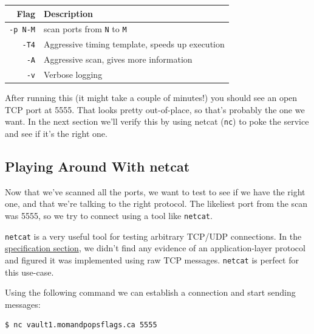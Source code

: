\documentclass[11pt]{article}
\begin{document}
    \begin{table}[h!]
        \centering
        \label{tab:nmap-command}
        \begin{tabular}{|r|l|}
            \hline
            \textbf{Flag} & \textbf{Description}                            \\ \hline
            \verb`-p N-M` & scan ports from \verb`N` to \verb`M`            \\ \hline
            \verb`-T4`    & Aggressive timing template, speeds up execution \\ \hline
            \verb`-A`     & Aggressive scan, gives more information         \\ \hline
            \verb`-v`     & Verbose logging                                 \\ \hline
        \end{tabular}
    \end{table}

    After running this (it might take a couple of minutes!) you should see an open TCP port at 5555. That looks pretty out-of-place, so that's probably the one we want. In the next section we'll verify this by using netcat (\verb`nc`) to poke the service and see if it's the right one.

    \subsection{Playing Around With netcat}\label{subsec:playing-around-with-netcat}

    Now that we've scanned all the ports, we want to test to see if we have the right one, and that we're talking to the right protocol. The likeliest port from the scan was 5555, so we try to connect using a tool like \verb`netcat`.

    \verb`netcat` is a very useful tool for testing arbitrary TCP/UDP connections. In the \hyperref[subsec:specification]{specification section}, we didn't find any evidence of an application-layer protocol and figured it was implemented using raw TCP messages. \verb`netcat` is perfect for this use-case.

    \bigskip

    Using the following command we can establish a connection and start sending messages:

    \begin{lstlisting}[gobble=8,label={lst:netcat-command}]
        $ nc vault1.momandpopsflags.ca 5555
    \end{lstlisting}
\end{document}
